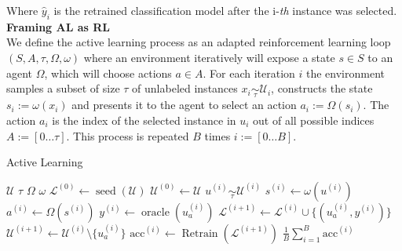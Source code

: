\documentclass[]{article}
\begin{document}
Where $\hat y_i$ is the retrained classification model after the i-\textit{th} instance was selected. \\ [1mm]
%
\textbf{Framing AL as RL}\\
We define the active learning process as an adapted reinforcement learning loop $(S, A, \tau, \Omega, \omega)$ where an environment iteratively will expose a state $s \in S$ to an agent $\Omega$, which will choose actions $a \in A$.
For each iteration $i$ the environment samples a subset of size $\tau$ of unlabeled instances $x_i \underset{\tau}{\sim} \mathcal{U}_i$, constructs the state $s_i := \omega(x_i)$ and presents it to the agent to select an action $a_i := \Omega(s_i)$.
The action $a_i$ is the index of the selected instance in $u_i$ out of all possible indices $A := [0 \ldots \tau]$.
This process is repeated $B$ times $i := [0 \ldots B]$.

\begin{algorithm}[H]
	\caption{Active Learning}\label{alg:active_learning}
	\begin{algorithmic}[1]
		\Require $\mathcal{U}$ 
		\Require $\tau$ 
		\Require $\Omega$ 
		\Require $\omega$ 
		\State $\mathcal{L}^{(0)} \gets \operatorname{seed}(\mathcal{U})$  
		\State $\mathcal{U}^{(0)} \gets \mathcal{U}$
			\State $u^{(i)} \underset{\tau}{\sim} \mathcal{U}^{(i)}$
			\State $s^{(i)} \gets \omega(u^{(i)})$
			\State $a^{(i)} \gets \Omega(s^{(i)})$ 
			\State $y^{(i)} \gets \operatorname{oracle}(u^{(i)}_{a})$ 
			\State $\mathcal{L}^{(i+1)} \gets \mathcal{L}^{(i)} \cup \{(u^{(i)}_a, y^{(i)})\}$
			\State $\mathcal{U}^{(i+1)} \gets \mathcal{U}^{(i)} \setminus \{u^{(i)}_a\}$
			\State $\text{acc}^{(i)} \gets \operatorname{Retrain}(\mathcal{L}^{(i+1)})$  
		\EndFor
		\State
		\Return $\frac{1}{B} \sum_{i=1}^{B} \text{acc}^{(i)}$
	\end{algorithmic}
\end{algorithm}
\end{document}
